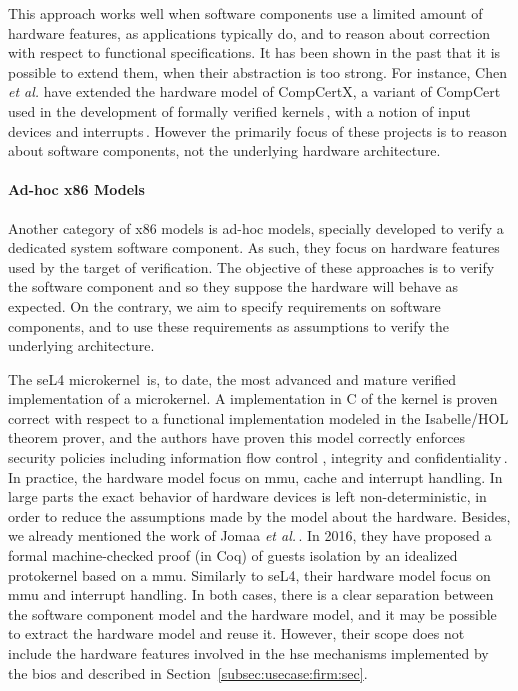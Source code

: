 This approach works well when software components use a limited amount of
hardware features, as applications typically do, and to reason about correction
with respect to functional specifications. 
%
It has been shown in the past that it is possible to extend them, when their
abstraction is too strong.
%
For instance, Chen \emph{et al.} have extended the hardware model of CompCertX,
a variant of CompCert used in the development of formally verified
kernels\,\cite{gu2016certikos}, with a notion of input devices and
interrupts\,\cite{chen2018interrupt}. However the primarily focus of these projects is to reason about software components, not the underlying hardware architecture.

\paragraph{Ad-hoc x86 Models}
%
Another category of x86 models is ad-hoc models, specially developed to verify a
dedicated system software component.
%
As such, they focus on hardware features used by the target of verification.
%
The objective of these approaches is to verify the software component and so
they suppose the hardware will behave as expected.
%
On the contrary, we aim to specify requirements on software components, and to
use these requirements as assumptions to verify the underlying architecture.

The seL4 microkernel\,\cite{sel4website} is, to date, the most advanced and
mature verified implementation of a microkernel.
%
A implementation in C of the kernel is proven correct with respect to a functional
implementation modeled in the Isabelle/HOL theorem prover, and the authors have
proven this model correctly enforces security policies including information
flow control , integrity and confidentiality\,\cite{klein2009sel4}.
%
In practice, the hardware model focus on \ac{mmu}, cache and interrupt handling.
In large parts the exact behavior of hardware devices is left
non-deterministic, in order to reduce the assumptions made by the model about
the hardware.
%
Besides, we already mentioned the work of Jomaa \emph{et
  al.}\,\cite{jomaa2016mmu}.
%
In 2016, they have proposed a formal machine-checked proof (in Coq) of guests
isolation by an idealized protokernel based on a \ac{mmu}.
%
Similarly to seL4, their hardware model focus on \ac{mmu} and interrupt
handling.
%
In both cases, there is a clear separation between the software component model
and the hardware model, and it may be possible to extract the hardware model and
reuse it.
%
However, their scope does not include the hardware features involved in the
\ac{hse} mechanisms implemented by the \ac{bios} and described in
Section~\ref{subsec:usecase:firm:sec}.

